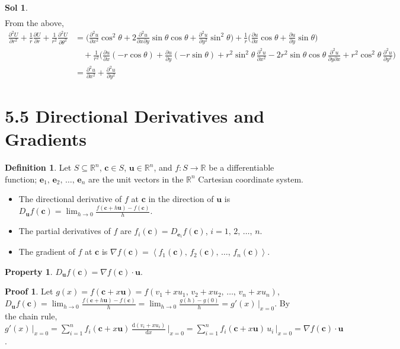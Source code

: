 \documentclass[12pt]{extarticle}
\newcommand{\ds}{\displaystyle}
\newcommand{\llt}{\left\langle}
\newcommand{\rgt}{\right\rangle}
\theoremstyle{definition}
\newtheorem*{dfn}{Definition}
\newtheorem*{prp}{Property}
\newtheorem*{sol}{Sol}
\newtheorem*{prf}{Proof}
\newcommand{\vc}{\mathbf{c}}
\newcommand{\ve}{\mathbf{e}}
\newcommand{\vu}{\mathbf{u}}
\newcommand{\pdiff}[2]{\frac{\partial #1}{\partial #2}}
\newcommand{\pdifft}[2]{\frac{\partial^2 #1}{\partial #2^2}}
\newcommand{\diff}[2]{\frac{\mathrm{d} #1}{\mathrm{d} #2}}
\begin{document}
\begin{sol}
\begin{align*}
  \end{align*}
  From the above,  
  \begin{align*}
    \pdifft{U}{r} + \frac{1}{r}\pdiff{U}{r} + \frac{1}{r^2}\pdifft{U}{\theta} &= \bigg(\pdifft{u}{x}\cos^2\theta + 2\frac{\partial^2 u}{\partial x\partial y}\sin\theta\cos\theta + \pdifft{u}{y}\sin^2\theta\bigg) + \frac{1}{r}\bigg(\pdiff{u}{x}\cos\theta + \pdiff{u}{y}\sin\theta\bigg) \\ &\quad+ \frac{1}{r^2}\bigg(\pdiff{u}{x}(-r\cos\theta) + \pdiff{u}{y}(-r\sin\theta) + r^2\sin^2\theta\,\pdifft{u}{x} -2r^2\sin\theta\cos\theta\,\frac{\partial^2 u}{\partial y\partial x} + r^2\cos^2\theta\,\pdifft{u}{y}\bigg) \\ &= \pdifft{u}{x}+ \pdifft{u}{y}
  \end{align*}
\end{sol}

\section*{5.5 Directional Derivatives and Gradients}

\begin{dfn}
  Let $S\subseteq\mathbb{R}^n$, $\vc\in S$, $\vu\in\mathbb{R}^n$, and $\ds f:S\to\mathbb{R}$ be a differentiable function; $\ve_1,\,\ve_2,\,\ldots,\,\ve_n$ are the unit vectors in the $\mathbb{R}^n$ Cartesian coordinate system. 
  \begin{itemize}\setlength{\itemsep}{0pt}
    \item The directional derivative of $f$ at $\vc$ in the direction of $\ds\vu$ is $\ds D_{\vu}f(\vc) = \lim_{h\to 0}\frac{f(\vc + h\vu) - f(\vc)}{h}$. 
    \item The partial derivatives of $f$ are $\ds f_i(\vc) = D_{\ve_i}f(\vc)$, $i = 1,\,2,\,\ldots,\,n$. 
    \item The gradient of $f$ at $\vc$ is $\ds\nabla f(\vc) = \llt f_1(\vc),\,f_2(\vc),\,\ldots,\,f_n(\vc)\rgt$. 
  \end{itemize}
\end{dfn}

\begin{prp}
  $\ds D_{\vu}f(\vc) = \nabla f(\vc)\cdot\vu$.  
\end{prp}

\begin{prf}
  Let $\ds g(x) = f(\vc + x\vu) = f(v_1 + x u_1,\,v_2 + x u_2,\,\ldots,\,v_n + x u_n)$, $\ds D_{\vu}f(\vc) = \lim_{h\to 0}\frac{f(\vc + h\vu) - f(\vc)}{h} = \lim_{h\to 0}\frac{g(h) - g(0)}{h} = g'(x)\,\big|_{x = 0}$. By the chain rule, $\ds g'(x)\,\big|_{x = 0} = \sum_{i = 1}^n f_i(\vc + x\vu)\,\diff{(v_i + x u_i)}{x}\,\bigg|_{x = 0} = \sum_{i = 1}^n f_i(\vc + x\vu)\,u_i\,\bigg|_{x = 0} = \nabla f(\vc)\cdot\vu$. 
\end{prf}
\end{document}
